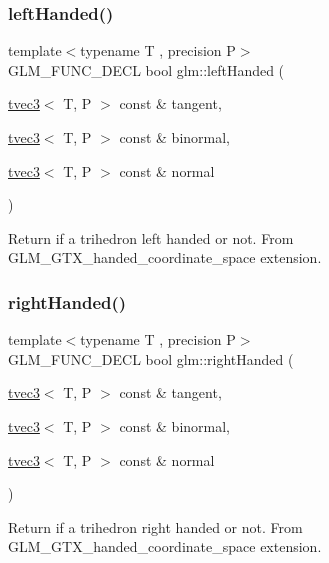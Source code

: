 \subsubsection{\texorpdfstring{left\+Handed()}{leftHanded()}}
{\footnotesize\ttfamily template$<$typename T , precision P$>$ \\
G\+L\+M\+\_\+\+F\+U\+N\+C\+\_\+\+D\+E\+CL bool glm\+::left\+Handed (\begin{DoxyParamCaption}\item[{\hyperlink{structglm_1_1tvec3}{tvec3}$<$ T, P $>$ const \&}]{tangent,  }\item[{\hyperlink{structglm_1_1tvec3}{tvec3}$<$ T, P $>$ const \&}]{binormal,  }\item[{\hyperlink{structglm_1_1tvec3}{tvec3}$<$ T, P $>$ const \&}]{normal }\end{DoxyParamCaption})}

Return if a trihedron left handed or not. From G\+L\+M\+\_\+\+G\+T\+X\+\_\+handed\+\_\+coordinate\+\_\+space extension. \mbox{\label{group__gtx__handed__coordinate__space_ga17cd83888de8755c0435c589fafd3603}} 
\subsubsection{\texorpdfstring{right\+Handed()}{rightHanded()}}
{\footnotesize\ttfamily template$<$typename T , precision P$>$ \\
G\+L\+M\+\_\+\+F\+U\+N\+C\+\_\+\+D\+E\+CL bool glm\+::right\+Handed (\begin{DoxyParamCaption}\item[{\hyperlink{structglm_1_1tvec3}{tvec3}$<$ T, P $>$ const \&}]{tangent,  }\item[{\hyperlink{structglm_1_1tvec3}{tvec3}$<$ T, P $>$ const \&}]{binormal,  }\item[{\hyperlink{structglm_1_1tvec3}{tvec3}$<$ T, P $>$ const \&}]{normal }\end{DoxyParamCaption})}

Return if a trihedron right handed or not. From G\+L\+M\+\_\+\+G\+T\+X\+\_\+handed\+\_\+coordinate\+\_\+space extension. 